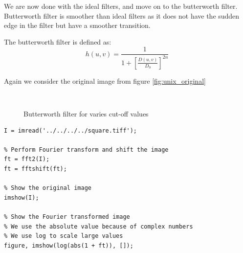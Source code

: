\documentclass[a4paper, 10pt, final]{article}
\begin{document}
We are now done with the ideal filters, and move on to the butterworth
filter. Butterworth filter is smoother than ideal filters as it does
not have the sudden edge in the filter but have a smoother transition.

The butterworth filter is defined as:
\begin{equation*}
    h(u, v) = \frac{1}{1 + \left[ \frac{D(u,v)}{D_{0}}\right]^{2n}} 
\end{equation*}

Again we consider the original image from figure
\ref{fig:unix_original}

\begin{figure}[!htbp]
  \centering
   \
   \
  \caption{Butterworth filter for varies cut-off values}
  \label{fig:unix_butterworth}
\end{figure}



\begin{lstlisting}[caption={Calculating and showing the Fourier
    transform of an image using MATLAB.}, captionpos=b,
    label={lst:fft_matlab}, float=b, numbers=none]
% Read the original image
I = imread('../../../../square.tiff');

% Perform Fourier transform and shift the image
ft = fft2(I);
ft = fftshift(ft);

% Show the original image
imshow(I);

% Show the Fourier transformed image
% We use the absolute value because of complex numbers
% We use log to scale large values
figure, imshow(log(abs(1 + ft)), []);
\end{lstlisting}
\end{document}
